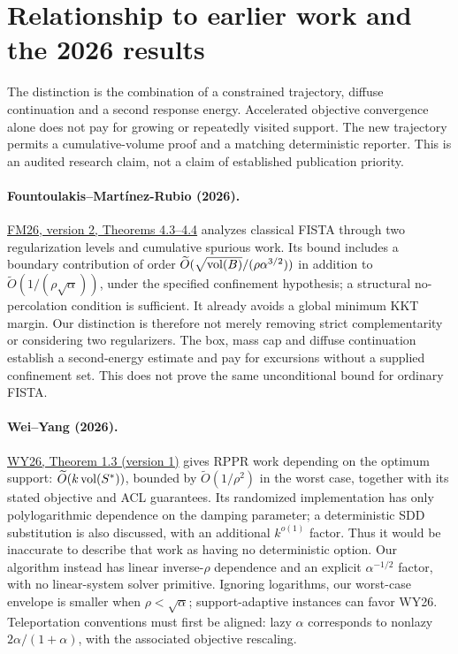 \section{Relationship to earlier work and the 2026 results}
\label{sec:det-op2-related}

The distinction is the combination of a constrained trajectory, diffuse
continuation and a second response energy. Accelerated objective convergence
alone does not pay for growing or repeatedly visited support. The new
trajectory permits a cumulative-volume proof and a matching deterministic
reporter. This is an audited research claim, not a claim of established
publication priority.

\paragraph{Fountoulakis--Mart\'inez-Rubio (2026).}
\href{https://arxiv.org/html/2602.21138v2}{FM26, version 2, Theorems 4.3--4.4}
analyzes classical FISTA through two regularization levels and cumulative
spurious work. Its bound includes a boundary contribution of order
$\widetilde O(\sqrt{\operatorname{vol}(B)}/(\rho\alpha^{3/2}))$ in addition to
$\widetilde O(1/(\rho\sqrt\alpha))$, under the specified confinement
hypothesis; a structural no-percolation condition is sufficient.
It already avoids a global minimum KKT margin. Our distinction is therefore
not merely removing strict complementarity or considering two regularizers.
The box, mass cap and diffuse continuation establish a second-energy estimate
and pay for excursions without a supplied confinement set. This does not
prove the same unconditional bound for ordinary FISTA.

\paragraph{Wei--Yang (2026).}
\href{https://arxiv.org/html/2608.16339v1}{WY26, Theorem 1.3 (version 1)}
gives RPPR work depending on the optimum support:
$\widetilde O(k\operatorname{vol}(S^*))$, bounded by
$\widetilde O(1/\rho^2)$ in the worst case, together with its stated
objective and ACL guarantees. Its randomized implementation has only
polylogarithmic dependence on the damping parameter; a deterministic SDD
substitution is also discussed, with an additional $k^{o(1)}$ factor.
Thus it would be inaccurate to describe that work as having no deterministic
option. Our algorithm instead has linear inverse-$\rho$ dependence and an
explicit $\alpha^{-1/2}$ factor, with no linear-system solver primitive.
Ignoring logarithms, our worst-case envelope is smaller when
$\rho<\sqrt\alpha$; support-adaptive instances can favor WY26.
Teleportation conventions must first be aligned: lazy $\alpha$ corresponds
to nonlazy $2\alpha/(1+\alpha)$, with the associated objective rescaling.

